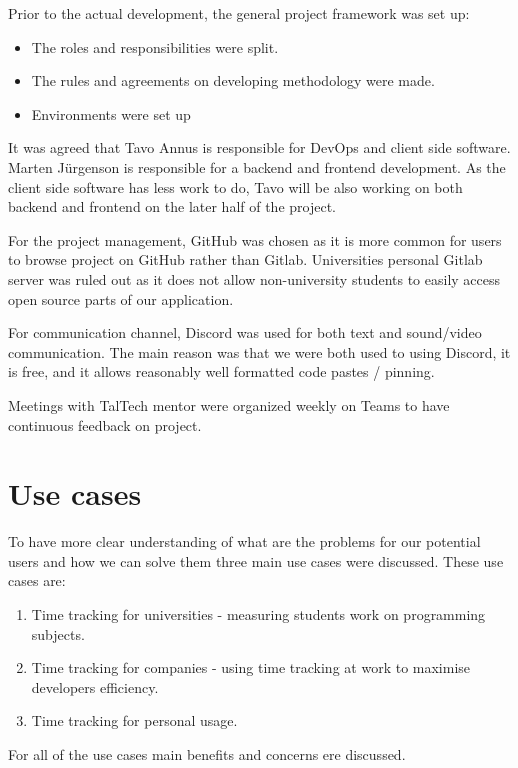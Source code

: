 Prior to the actual development, the general project framework was set up:
\begin{itemize}
    \item The roles and responsibilities were split.
    \item The rules and agreements on developing methodology were made.
    \item Environments were set up
\end{itemize}

It was agreed that Tavo Annus is responsible for DevOps and client side software.
Marten Jürgenson is responsible for a backend and frontend development.
As the client side software has less work to do, Tavo will be also working on both backend and
frontend on the later half of the project.

For the project management, GitHub was chosen as it is more common for users to browse project on GitHub rather than Gitlab.
Universities personal Gitlab server was ruled out as it does not allow non-university students to easily access open source parts of our application.

For communication channel, Discord was used for both text and sound/video communication.
The main reason was that we were both used to using Discord, it is free, and it allows reasonably well formatted code pastes / pinning.

Meetings with TalTech mentor were organized weekly on Teams to have continuous feedback on project.


\section{Use cases}\label{sec:use-cases}
To have more clear understanding of what are the problems for our potential users and how we can solve them three main use cases were discussed.
These use cases are:
\begin{enumerate}
    \item Time tracking for universities - measuring students work on programming subjects.
    \item Time tracking for companies - using time tracking at work to maximise developers efficiency.
    \item Time tracking for personal usage.
\end{enumerate}

For all of the use cases main benefits and concerns ere discussed.

